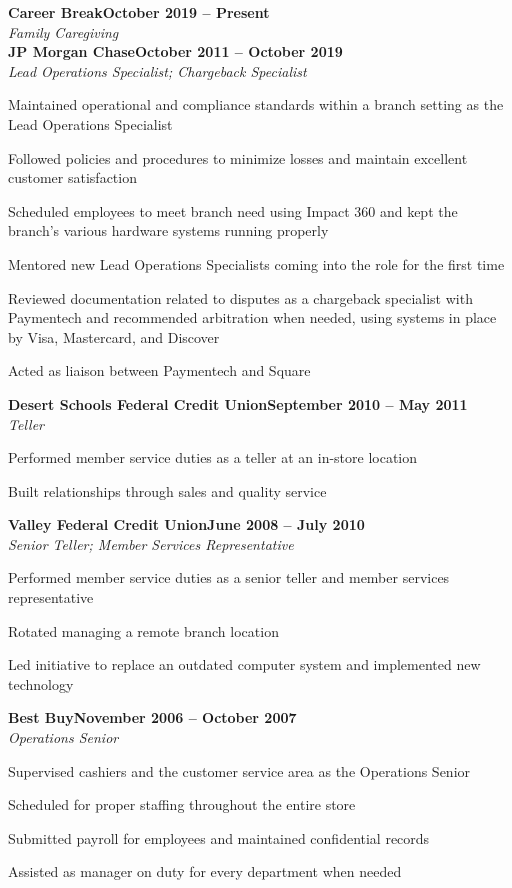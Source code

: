 \documentclass[letterpaper,10pt]{article}
\newcommand{\heading}[2]{
  \hspace{10pt}#1\hfill#2\\
}
\newcommand{\headingBf}[2]{
  \heading{\textbf{#1}}{\textbf{#2}}
}
\newcommand{\headingIt}[2]{
  \heading{\textit{#1}}{\textit{#2}}
}
\newenvironment{resume_list}{
  \vspace{-7pt}
  \begin{itemize}[itemsep=-2px, parsep=1pt, leftmargin=30pt]
}{
  \end{itemize}
}
\begin{document}
  \headingBf{Career Break}{October 2019 -- Present}
  \headingIt{Family Caregiving}{}

  \headingBf{JP Morgan Chase}{October 2011 -- October 2019}
  \headingIt{Lead Operations Specialist; Chargeback Specialist}{}
  \begin{resume_list}
    \item Maintained operational and compliance standards within a branch setting as the Lead Operations Specialist
    \item Followed policies and procedures to minimize losses and maintain excellent customer satisfaction
    \item Scheduled employees to meet branch need using Impact 360 and kept the branch's various hardware systems running properly
    \item Mentored new Lead Operations Specialists coming into the role for the first time
    \item Reviewed documentation related to disputes as a chargeback specialist with Paymentech and recommended arbitration when needed, using systems in place by Visa, Mastercard, and Discover
    \item Acted as liaison between Paymentech and Square
  \end{resume_list}

  \headingBf{Desert Schools Federal Credit Union}{September 2010 -- May 2011}
  \headingIt{Teller}{}
  \begin{resume_list}
    \item Performed member service duties as a teller at an in-store location
    \item Built relationships through sales and quality service
  \end{resume_list}

  \headingBf{Valley Federal Credit Union}{June 2008 -- July 2010}
  \headingIt{Senior Teller; Member Services Representative}{}
  \begin{resume_list}
    \item Performed member service duties as a senior teller and member services representative
    \item Rotated managing a remote branch location
    \item Led initiative to replace an outdated computer system and implemented new technology
  \end{resume_list}

  \headingBf{Best Buy}{November 2006 -- October 2007}
  \headingIt{Operations Senior}{}
  \begin{resume_list}
    \item Supervised cashiers and the customer service area as the Operations Senior
    \item Scheduled for proper staffing throughout the entire store
    \item Submitted payroll for employees and maintained confidential records
    \item Assisted as manager on duty for every department when needed
  \end{resume_list}
\end{document}
